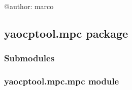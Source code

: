 \documentclass[letterpaper,10pt,english]{sphinxmanual}
\begin{document}
@author: marco


\subsection{yaocptool.mpc package}
\label{\detokenize{yaocptool.mpc:yaocptool-mpc-package}}\label{\detokenize{yaocptool.mpc::doc}}

\subsubsection{Submodules}
\label{\detokenize{yaocptool.mpc:submodules}}

\subsubsection{yaocptool.mpc.mpc module}
\label{\detokenize{yaocptool.mpc:module-yaocptool.mpc.mpc}}\label{\detokenize{yaocptool.mpc:yaocptool-mpc-mpc-module}}
\end{document}
